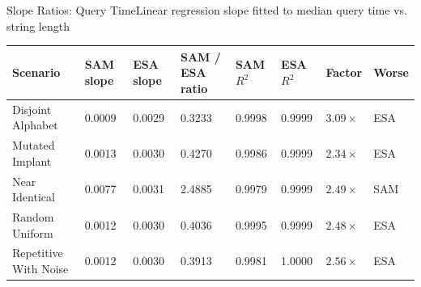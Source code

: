 \begin{benchmarktable}{Slope Ratios: Query Time}{Linear regression slope fitted to median query time vs. string length }
\begin{tabularx}{\textwidth}{|X|X|X|X|X|X|X|X|}
\toprule
Scenario & SAM slope & ESA slope & SAM / ESA ratio & SAM $R^2$ & ESA $R^2$ & Factor & Worse \\
\midrule
Disjoint Alphabet & 0.0009 & 0.0029 & 0.3233 & 0.9998 & 0.9999 & $3.09\times$ & ESA \\
\hline
Mutated Implant & 0.0013 & 0.0030 & 0.4270 & 0.9986 & 0.9999 & $2.34\times$ & ESA \\
\hline
Near Identical & 0.0077 & 0.0031 & 2.4885 & 0.9979 & 0.9999 & $2.49\times$ & SAM \\
\hline
Random Uniform & 0.0012 & 0.0030 & 0.4036 & 0.9995 & 0.9999 & $2.48\times$ & ESA \\
\hline
Repetitive With Noise & 0.0012 & 0.0030 & 0.3913 & 0.9981 & 1.0000 & $2.56\times$ & ESA \\
\bottomrule
\end{tabularx}
\end{benchmarktable}
